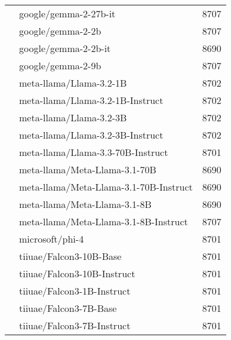 \begin{table}[]
\begin{tabular}{llr}
 & google/gemma-2-27b-it & 8707 \\
 & google/gemma-2-2b & 8707 \\
 & google/gemma-2-2b-it & 8690 \\
 & google/gemma-2-9b & 8707 \\
 & meta-llama/Llama-3.2-1B & 8702 \\
 & meta-llama/Llama-3.2-1B-Instruct & 8702 \\
 & meta-llama/Llama-3.2-3B & 8702 \\
 & meta-llama/Llama-3.2-3B-Instruct & 8702 \\
 & meta-llama/Llama-3.3-70B-Instruct & 8701 \\
 & meta-llama/Meta-Llama-3.1-70B & 8690 \\
 & meta-llama/Meta-Llama-3.1-70B-Instruct & 8690 \\
 & meta-llama/Meta-Llama-3.1-8B & 8690 \\
 & meta-llama/Meta-Llama-3.1-8B-Instruct & 8707 \\
 & microsoft/phi-4 & 8701 \\
 & tiiuae/Falcon3-10B-Base & 8701 \\
 & tiiuae/Falcon3-10B-Instruct & 8701 \\
 & tiiuae/Falcon3-1B-Instruct & 8701 \\
 & tiiuae/Falcon3-7B-Base & 8701 \\
 & tiiuae/Falcon3-7B-Instruct & 8701 \\
\bottomrule
\end{tabular}
    \label{tab:gemma-2-9b-it}
\end{table}

